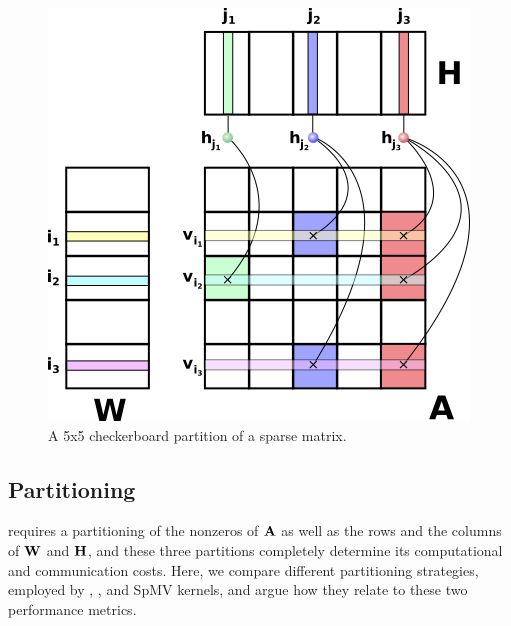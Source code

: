 \begin{figure}
\caption{A 5x5 checkerboard partition of a sparse matrix.}
\label{fig:partition}
\includegraphics[width=0.8\linewidth]{figures/matrix-partition.png}
\end{figure}

\subsection{Partitioning} \label{sec:partitioning}

%

 requires a partitioning of the nonzeros of $\mathbf{A}$ as well as the rows and the columns of $\mathbf{W}$ and $\mathbf{H}$, and these three partitions completely determine its computational and communication costs.
Here, we compare different partitioning strategies, employed by \mpifaun, \hypertensor, and SpMV kernels, and argue how they relate to these two performance metrics.

